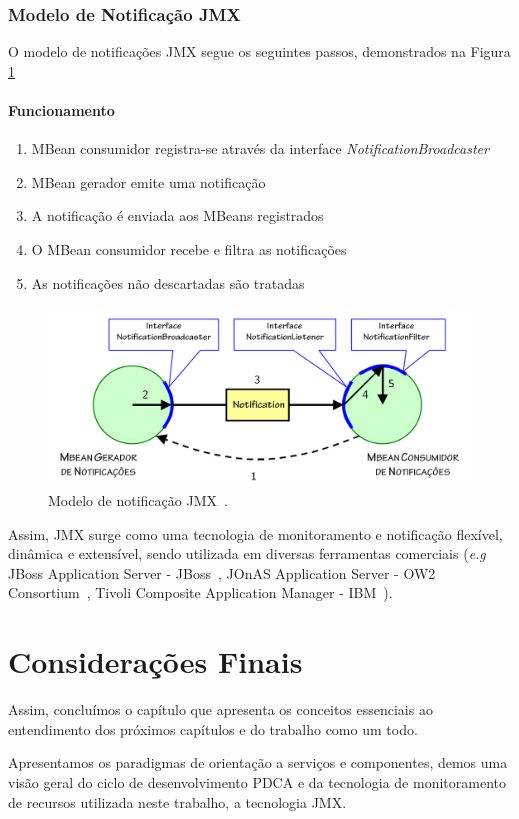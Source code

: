 \subsubsection{Modelo de Notificação JMX}
O modelo de notificações JMX segue os seguintes passos, demonstrados na Figura \ref{fig:notifyjmx}

\paragraph{Funcionamento} 
\begin{enumerate}
\item MBean consumidor registra-se através da interface \textit{NotificationBroadcaster}

\item MBean gerador emite uma notificação

\item A notificação é enviada aos MBeans registrados

\item O MBean consumidor recebe e filtra as notificações

\item As notificações não descartadas são tratadas
\end{enumerate}

\begin{figure}[htp]
\centering
\includegraphics[width=13cm]{chapters/chapter2/notification_model.png}
\caption[Modelo de notificação JMX]{Modelo de notificação JMX~\cite{pericasgerencia}.}
\label{fig:notifyjmx}
\end{figure}

Assim, JMX surge como uma tecnologia de monitoramento e notificação flexível, dinâmica e extensível, sendo utilizada em diversas ferramentas comerciais (\textit{e.g } JBoss Application Server - JBoss~\cite{jboss}, JOnAS Application Server - OW2 Consortium~\cite{jonas}, Tivoli Composite Application Manager - IBM~\cite{tivoli}). 

\section{Considerações Finais}
Assim, concluímos o capítulo que apresenta os conceitos essenciais ao entendimento dos próximos capítulos e do trabalho como um todo.

Apresentamos os paradigmas de orientação a serviços e componentes, demos uma visão geral do ciclo de desenvolvimento PDCA e da tecnologia de monitoramento de recursos utilizada neste trabalho, a tecnologia JMX.